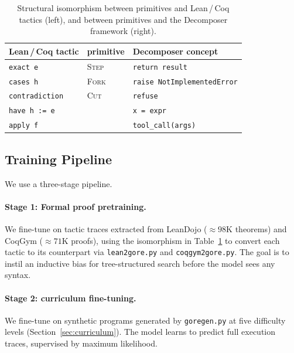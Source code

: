 \begin{table}[h]
  \centering
  \caption{Structural isomorphism between \gore{} primitives and Lean\,/\,Coq
           tactics (left), and between \gore{} primitives and the Decomposer
           framework (right).}
  \label{tab:isomorphism}
  \begin{tabular}{lll}
    \toprule
    Lean\,/\,Coq tactic & \gore{} primitive & Decomposer concept \\
    \midrule
    \texttt{exact e}       & \textsc{Step}  & \texttt{return result} \\
    \texttt{cases h}       & \textsc{Fork}  & \texttt{raise NotImplementedError} \\
    \texttt{contradiction} & \textsc{Cut}   & \texttt{refuse} \\
    \texttt{have h := e}   & {}     & \texttt{x = expr} \\
    \texttt{apply f}       & \callstmt{}    & \texttt{tool\_call(args)} \\
    \bottomrule
  \end{tabular}
\end{table}


\subsection{Training Pipeline}
\label{sec:training}

We use a three-stage pipeline.

\paragraph{Stage 1: Formal proof pretraining.}
We fine-tune on tactic traces extracted from LeanDojo
\citep{yang2023leandojo} (${\approx}98$K theorems) and CoqGym
\citep{yang2019coqgym} (${\approx}71$K proofs), using the isomorphism in
Table~\ref{tab:isomorphism} to convert each tactic to its \gore{} counterpart
via \texttt{lean2gore.py} and \texttt{coqgym2gore.py}.
The goal is to instil an inductive bias for tree-structured search before the
model sees any \gore{} syntax.

\paragraph{Stage 2: \gore{} curriculum fine-tuning.}
We fine-tune on synthetic \gore{} programs generated by \texttt{goregen.py} at
five difficulty levels (Section~\ref{sec:curriculum}).
The model learns to predict full execution traces, supervised by maximum
likelihood.

